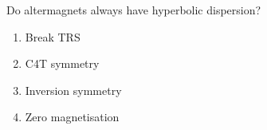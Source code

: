 \documentclass[usepdftitle=false]{beamer}
\begin{document}
\begin{frame}[noframenumbering]{Do altermagnets always have hyperbolic dispersion?}
    \pause
    \begin{enumerate}
        \item Break TRS \pause
        \item C4T symmetry \pause
        \item Inversion symmetry \pause
        \item Zero magnetisation
    \end{enumerate}
\end{frame}
\end{document}
